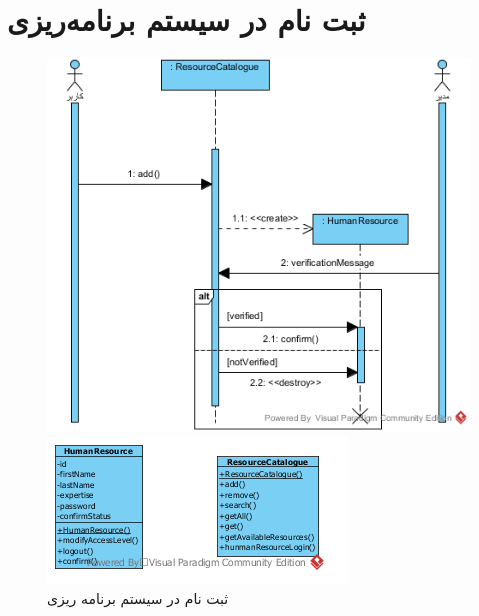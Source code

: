 \section{ثبت نام در سیستم برنامه‌ریزی}
\begin{figure}[H]
	\centering
	\includegraphics[scale=0.8]{img/sequence-analysis/SignUp}
	
	
	\includegraphics[scale=0.7]{img/sequence-analysis/SignUpC}
	\caption{ثبت نام در سیستم برنامه ریزی}
\end{figure}

